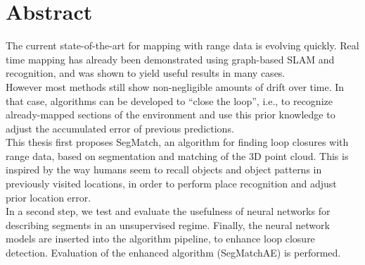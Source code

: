 \chapter*{Abstract}

The current state-of-the-art for mapping with range data is evolving quickly. Real time mapping has already been demonstrated using graph-based SLAM and recognition, and was shown to yield useful results in many cases.\\

However most methods still show non-negligible amounts of drift over time. In that case, algorithms can be developed to “close the loop”, i.e., to recognize already-mapped sections of the environment and use this prior knowledge to adjust the accumulated error of previous predictions.\\

This thesis first proposes SegMatch, an algorithm for finding loop closures with range data, based on segmentation and matching of the 3D point cloud. This is inspired by the way humans seem to recall objects and object patterns in previously visited locations, in order to perform place recognition and adjust prior location error.\\

In a second step, we test and evaluate the usefulness of neural networks for describing segments in an unsupervised regime. Finally, the neural network models are inserted into the algorithm pipeline, to enhance loop closure detection. Evaluation of the enhanced algorithm (SegMatchAE) is performed.\\
